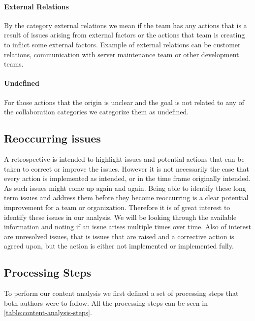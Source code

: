 \paragraph{External Relations}
By the category external relations we mean if the team has any actions that is a result of issues arising from external factors or the actions that team is creating to inflict some external factors. Example of external relations can be customer relations, communication with server maintenance team or other development teams.   
\paragraph{Undefined}
For those actions that the origin is unclear and the goal is not related to any of the collaboration categories we categorize them as undefined.

\subsection{Reoccurring issues}
A retrospective is intended to highlight issues and potential actions that can be taken to correct or improve the issues. However it is not necessarily the case that every action is implemented as intended, or in the time frame originally intended. As such issues might come up again and again. Being able to identify these long term issues and address them before they become reoccurring is a clear potential improvement for a team or organization. Therefore it is of great interest to identify these issues in our analysis. We will be looking through the available information and noting if an issue arises multiple times over time. Also of interest are unresolved issues, that is issues that are raised and a corrective action is agreed upon, but the action is either not implemented or implemented fully.

\subsection{Processing Steps}
To perform our content analysis we first defined a set of processing steps that both authors were to follow. All the processing steps can be seen in \autoref{table:content-analysis-steps}.

